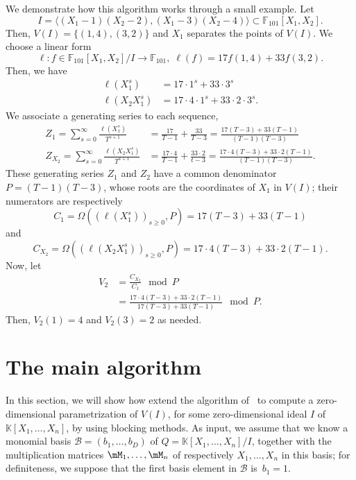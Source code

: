 \documentclass[12pt]{article}
\newcommand{\basis}{\mathscr{B}}
\newcommand{\minpoly}{P}
\def\F {\ensuremath{\mathbb{F}}}
\def\K{\mathbb{K}}
\def\K {\ensuremath{\mathbb{K}}}
\begin{document}
We demonstrate how this algorithm works through a small example. Let 
$$I = \langle (X_1-1)(X_2-2),(X_1-3)(X_2-4)\rangle \subset
\F_{101}[X_1,X_2].$$ Then, $V(I) = \{ (1,4),(3,2) \}$ and $X_1$ separates the
points of $V(I)$. We choose a  linear form 
$$\ell: f \in \F_{101}[X_1,X_2]/I \to \F_{101},\;\ell(f) = 17 f(1,4) + 33 f(3,2).$$
Then, we have
\begin{align*}
\ell(X_1^s) &= 17 \cdot 1^s + 33 \cdot 3^s\\
\ell(X_2X_1^s) &= 17 \cdot 4 \cdot 1^s + 33 \cdot 2 \cdot 3^s.
\end{align*} 
We associate a generating series to each sequence,
\begin{align*}
Z_1 = \sum_{s = 0}^{\infty} \frac{\ell(X^s_1)}{T^{s+1}}
&= \frac{17}{T-1} + \frac{33}{T-3}
= \frac{17(T-3)+33(T-1)}{(T-1)(T-3)} \\
Z_{X_2} = \sum_{s=0}^{\infty} \frac{\ell(X_2X_1^s)}{T^{s+1} }
&= \frac{17\cdot 4}{T-1} + \frac{33 \cdot 2}{t-3}
= \frac{17\cdot 4 (T-3) + 33\cdot 2(T-1)}{(T-1)(T-3)}.
\end{align*}
These generating series $Z_1$ and $Z_2$ have a common denominator $\minpoly = (T-1)(T-3)$,
whose roots are the coordinates of $X_1$ in $V(I)$;
their numerators are respectively
$$C_{1} = \Omega((\ell(X^s_1))_{s\ge 0},\minpoly) = 17 (T-3) + 33(T-1)$$
and
$$C_{X_2} = \Omega((\ell(X_2X^s_1))_{s\ge 0},\minpoly) = 17\cdot 4 (T-3) + 33\cdot 2(T-1).$$
Now, let
\begin{align*}
V_2 
&=\frac{C_{X_2}}{C_1} \mod \minpoly\\
&=\frac{17\cdot 4 (T-3) + 33\cdot 2(T-1)}{17(T-3)+33(T-1)} \mod \minpoly.
\end{align*}
Then, $ V_2(1) = 4$ and $V_2(3) = 2$ as needed.


\section{The main algorithm}

In this section, we will show how extend the algorithm
of~\cite{BoSaSc03} to compute a zero-dimensional parametrization of
$V(I)$, for some zero-dimensional ideal $I$ of $\K[X_1,\dots,X_n]$, by
using blocking methods. As input, we assume that we know a monomial
basis $\basis=(b_1,\dots,b_D)$ of $Q=\K[X_1,\dots,X_n]/I$, together with the
multiplication matrices $\mM_1,\dots,\mM_n$ of respectively
$X_1,\dots,X_n$ in this basis; for definiteness, we suppose that the
first basis element in $\basis$ is~$b_1=1$. 
\end{document}
